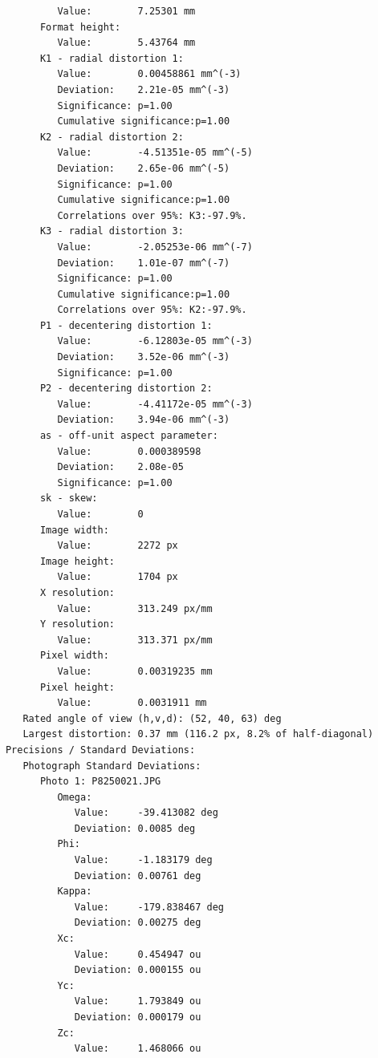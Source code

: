 \documentclass{article}
\begin{document}
\begin{verbatim}
               Value:        7.25301 mm
            Format height:
               Value:        5.43764 mm
            K1 - radial distortion 1:
               Value:        0.00458861 mm^(-3)
               Deviation:    2.21e-05 mm^(-3)
               Significance: p=1.00
               Cumulative significance:p=1.00
            K2 - radial distortion 2:
               Value:        -4.51351e-05 mm^(-5)
               Deviation:    2.65e-06 mm^(-5)
               Significance: p=1.00
               Cumulative significance:p=1.00
               Correlations over 95%: K3:-97.9%.
            K3 - radial distortion 3:
               Value:        -2.05253e-06 mm^(-7)
               Deviation:    1.01e-07 mm^(-7)
               Significance: p=1.00
               Cumulative significance:p=1.00
               Correlations over 95%: K2:-97.9%.
            P1 - decentering distortion 1:
               Value:        -6.12803e-05 mm^(-3)
               Deviation:    3.52e-06 mm^(-3)
               Significance: p=1.00
            P2 - decentering distortion 2:
               Value:        -4.41172e-05 mm^(-3)
               Deviation:    3.94e-06 mm^(-3)
            as - off-unit aspect parameter:
               Value:        0.000389598 
               Deviation:    2.08e-05 
               Significance: p=1.00
            sk - skew:
               Value:        0 
            Image width:
               Value:        2272 px
            Image height:
               Value:        1704 px
            X resolution:
               Value:        313.249 px/mm
            Y resolution:
               Value:        313.371 px/mm
            Pixel width:
               Value:        0.00319235 mm
            Pixel height:
               Value:        0.0031911 mm
         Rated angle of view (h,v,d): (52, 40, 63) deg
         Largest distortion: 0.37 mm (116.2 px, 8.2% of half-diagonal)
      Precisions / Standard Deviations:
         Photograph Standard Deviations:
            Photo 1: P8250021.JPG
               Omega:
                  Value:     -39.413082 deg
                  Deviation: 0.0085 deg
               Phi:
                  Value:     -1.183179 deg
                  Deviation: 0.00761 deg
               Kappa:
                  Value:     -179.838467 deg
                  Deviation: 0.00275 deg
               Xc:
                  Value:     0.454947 ou
                  Deviation: 0.000155 ou
               Yc:
                  Value:     1.793849 ou
                  Deviation: 0.000179 ou
               Zc:
                  Value:     1.468066 ou

\end{verbatim}
\end{document}
